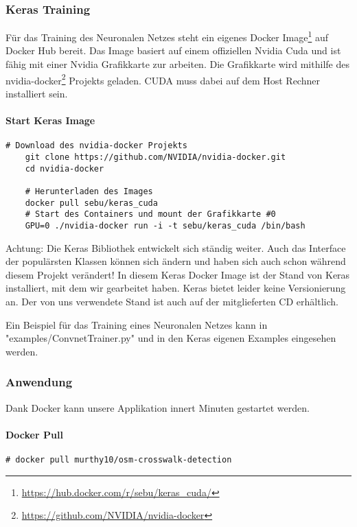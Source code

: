 \subsubsection{Keras Training}
Für das Training des Neuronalen Netzes steht ein eigenes Docker Image\footnote{\url{https://hub.docker.com/r/sebu/keras_cuda/}} auf Docker Hub bereit. Das Image basiert auf einem offiziellen Nvidia Cuda und ist fähig mit einer Nvidia Grafikkarte zur arbeiten. Die Grafikkarte wird mithilfe des nvidia-docker\footnote{\url{https://github.com/NVIDIA/nvidia-docker}} Projekts geladen. CUDA muss dabei auf dem Host Rechner installiert sein.


\paragraph{Start Keras Image}
\begin{lstlisting}[style=BashInputStyle]
	# Download des nvidia-docker Projekts
	git clone https://github.com/NVIDIA/nvidia-docker.git
	cd nvidia-docker
	
	# Herunterladen des Images
	docker pull sebu/keras_cuda
	# Start des Containers und mount der Grafikkarte #0
	GPU=0 ./nvidia-docker run -i -t sebu/keras_cuda /bin/bash
\end{lstlisting}

Achtung: Die Keras Bibliothek entwickelt sich ständig weiter. Auch das Interface der populärsten Klassen können sich ändern und haben sich auch schon während diesem Projekt verändert! In diesem Keras Docker Image ist der Stand von Keras installiert, mit dem wir gearbeitet haben. Keras bietet leider keine Versionierung an. Der von uns verwendete Stand ist auch auf der mitglieferten CD erhältlich.

Ein Beispiel für das Training eines Neuronalen Netzes kann in "examples/ConvnetTrainer.py" und in den Keras eigenen Examples eingesehen werden.
\newpage
\subsubsection{Anwendung}
Dank Docker kann unsere Applikation innert Minuten gestartet werden.

\paragraph{Docker Pull}
\begin{lstlisting}[style=BashInputStyle]
	# docker pull murthy10/osm-crosswalk-detection
\end{lstlisting}

